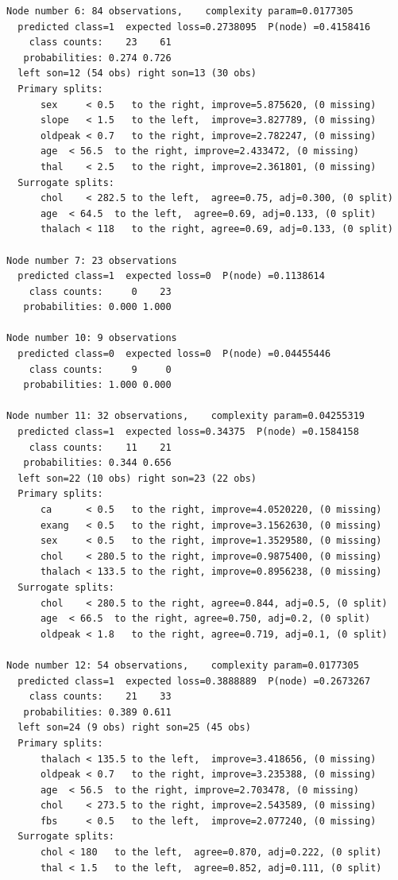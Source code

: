 \documentclass{article}
\begin{document}
\begin{lstlisting}
Node number 6: 84 observations,    complexity param=0.0177305
  predicted class=1  expected loss=0.2738095  P(node) =0.4158416
    class counts:    23    61
   probabilities: 0.274 0.726 
  left son=12 (54 obs) right son=13 (30 obs)
  Primary splits:
      sex     < 0.5   to the right, improve=5.875620, (0 missing)
      slope   < 1.5   to the left,  improve=3.827789, (0 missing)
      oldpeak < 0.7   to the right, improve=2.782247, (0 missing)
      age  < 56.5  to the right, improve=2.433472, (0 missing)
      thal    < 2.5   to the right, improve=2.361801, (0 missing)
  Surrogate splits:
      chol    < 282.5 to the left,  agree=0.75, adj=0.300, (0 split)
      age  < 64.5  to the left,  agree=0.69, adj=0.133, (0 split)
      thalach < 118   to the right, agree=0.69, adj=0.133, (0 split)

Node number 7: 23 observations
  predicted class=1  expected loss=0  P(node) =0.1138614
    class counts:     0    23
   probabilities: 0.000 1.000 

Node number 10: 9 observations
  predicted class=0  expected loss=0  P(node) =0.04455446
    class counts:     9     0
   probabilities: 1.000 0.000 

Node number 11: 32 observations,    complexity param=0.04255319
  predicted class=1  expected loss=0.34375  P(node) =0.1584158
    class counts:    11    21
   probabilities: 0.344 0.656 
  left son=22 (10 obs) right son=23 (22 obs)
  Primary splits:
      ca      < 0.5   to the right, improve=4.0520220, (0 missing)
      exang   < 0.5   to the right, improve=3.1562630, (0 missing)
      sex     < 0.5   to the right, improve=1.3529580, (0 missing)
      chol    < 280.5 to the right, improve=0.9875400, (0 missing)
      thalach < 133.5 to the right, improve=0.8956238, (0 missing)
  Surrogate splits:
      chol    < 280.5 to the right, agree=0.844, adj=0.5, (0 split)
      age  < 66.5  to the right, agree=0.750, adj=0.2, (0 split)
      oldpeak < 1.8   to the right, agree=0.719, adj=0.1, (0 split)

Node number 12: 54 observations,    complexity param=0.0177305
  predicted class=1  expected loss=0.3888889  P(node) =0.2673267
    class counts:    21    33
   probabilities: 0.389 0.611 
  left son=24 (9 obs) right son=25 (45 obs)
  Primary splits:
      thalach < 135.5 to the left,  improve=3.418656, (0 missing)
      oldpeak < 0.7   to the right, improve=3.235388, (0 missing)
      age  < 56.5  to the right, improve=2.703478, (0 missing)
      chol    < 273.5 to the right, improve=2.543589, (0 missing)
      fbs     < 0.5   to the left,  improve=2.077240, (0 missing)
  Surrogate splits:
      chol < 180   to the left,  agree=0.870, adj=0.222, (0 split)
      thal < 1.5   to the left,  agree=0.852, adj=0.111, (0 split)


\end{lstlisting}
\end{document}
